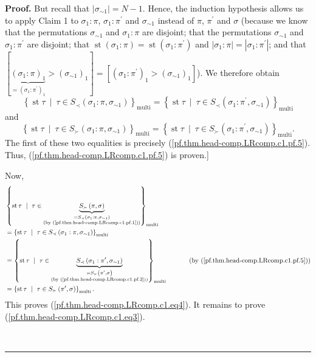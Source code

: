 \documentclass[numbers=enddot,12pt,final,onecolumn,notitlepage]{scrartcl}%
\theoremstyle{definition}
\newenvironment{proof}[1][Proof]{\noindent\textbf{#1.} }{\ \rule{0.5em}{0.5em}}
\begin{document}
\begin{proof}
But recall that $\left\vert \sigma_{\sim1}\right\vert =N-1$. Hence, the
induction hypothesis allows us to apply Claim 1 to $\sigma_{1}:\pi$,
$\sigma_{1}:\pi^{\prime}$ and $\sigma_{\sim1}$ instead of $\pi$, $\pi^{\prime
}$ and $\sigma$ (because we know that the permutations $\sigma_{\sim1}$ and
$\sigma_{1}:\pi$ are disjoint; that the permutations $\sigma_{\sim1}$ and
$\sigma_{1}:\pi^{\prime}$ are disjoint; that $\operatorname{st}\left(
\sigma_{1}:\pi\right)  =\operatorname{st}\left(  \sigma_{1}:\pi^{\prime
}\right)  $ and $\left\vert \sigma_{1}:\pi\right\vert =\left\vert \sigma
_{1}:\pi^{\prime}\right\vert $; and that $\left[  \underbrace{\left(
\sigma_{1}:\pi\right)  _{1}}_{=\left(  \sigma_{1}:\pi^{\prime}\right)  _{1}%
}>\left(  \sigma_{\sim1}\right)  _{1}\right]  =\left[  \left(  \sigma_{1}%
:\pi^{\prime}\right)  _{1}>\left(  \sigma_{\sim1}\right)  _{1}\right]  $). We
therefore obtain%
\[
\left\{  \operatorname{st} \tau   \ \mid\ \tau\in S_{\prec
}\left(  \sigma_{1}:\pi,\sigma_{\sim1}\right)  \right\}
_{\operatorname*{multi}}=\left\{  \operatorname{st} \tau 
\ \mid\ \tau\in S_{\prec}\left(  \sigma_{1}:\pi^{\prime},\sigma_{\sim
1}\right)  \right\}  _{\operatorname*{multi}}%
\]
and%
\[
\left\{  \operatorname{st} \tau   \ \mid\ \tau\in S_{\succ
}\left(  \sigma_{1}:\pi,\sigma_{\sim1}\right)  \right\}
_{\operatorname*{multi}}=\left\{  \operatorname{st} \tau 
\ \mid\ \tau\in S_{\succ}\left(  \sigma_{1}:\pi^{\prime},\sigma_{\sim
1}\right)  \right\}  _{\operatorname*{multi}}.
\]
The first of these two equalities is precisely
(\ref{pf.thm.head-comp.LRcomp.c1.pf.5}). Thus,
(\ref{pf.thm.head-comp.LRcomp.c1.pf.5}) is proven.]

Now,
\begin{align}
&  \left\{  \operatorname{st} \tau   \ \mid\ \tau\in
\underbrace{S_{\succ}\left(  \pi,\sigma\right)  }_{\substack{=S_{\prec}\left(
\sigma_{1}:\pi,\sigma_{\sim1}\right)  \\\text{(by
(\ref{pf.thm.head-comp.LRcomp.c1.pf.1}))}}}\right\}  _{\operatorname*{multi}%
}\nonumber\\
&  =\left\{  \operatorname{st} \tau   \ \mid\ \tau\in S_{\prec
}\left(  \sigma_{1}:\pi,\sigma_{\sim1}\right)  \right\}
_{\operatorname*{multi}}\nonumber\\
&  =\left\{  \operatorname{st} \tau   \ \mid\ \tau
\in\underbrace{S_{\prec}\left(  \sigma_{1}:\pi^{\prime},\sigma_{\sim1}\right)
}_{\substack{=S_{\succ}\left(  \pi^{\prime},\sigma\right)  \\\text{(by
(\ref{pf.thm.head-comp.LRcomp.c1.pf.2}))}}}\right\}  _{\operatorname*{multi}%
}\ \ \ \ \ \ \ \ \ \ \left(  \text{by (\ref{pf.thm.head-comp.LRcomp.c1.pf.5}%
)}\right) \nonumber\\
&  =\left\{  \operatorname{st} \tau   \ \mid\ \tau\in S_{\succ
}\left(  \pi^{\prime},\sigma\right)  \right\}  _{\operatorname*{multi}}.
\label{pf.thm.head-comp.LRcomp.c1.pf.6}%
\end{align}
This proves (\ref{pf.thm.head-comp.LRcomp.c1.eq4}). It remains to prove
(\ref{pf.thm.head-comp.LRcomp.c1.eq3}).


\end{proof}
\end{document}
